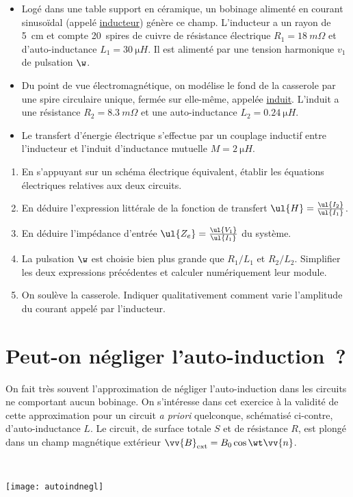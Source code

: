 \documentclass[a4paper, 10pt, final, garamond]{book}
\begin{document}
\begin{itemize}[label=$\diamond$, leftmargin=10pt]
  \item Logé dans une table support en céramique, un bobinage alimenté en
    courant sinusoïdal (appelé \ul{inducteur}) génère ce champ. L'inducteur a un
    rayon de \SI{5}{cm} et compte \SI{20}{spires} de cuivre de résistance
    électrique $R_1 = \SI{18}{m\Omega}$ et d'auto-inductance $L_1 =
    \SI{30}{\micro H}$. Il est alimenté par une tension harmonique $v_1$ de
    pulsation $\w$.
  \item Du point de vue électromagnétique, on modélise le fond de la casserole
    par une spire circulaire unique, fermée sur elle-même, appelée \ul{induit}.
    L'induit a une résistance $R_2 = \SI{8.3}{m\Omega}$ et une auto-inductance
    $L_2 = \SI{0.24}{\micro H}$.
  \item Le transfert d'énergie électrique s'effectue par un couplage inductif
    entre l'inducteur et l'induit d'inductance mutuelle $M = \SI{2}{\micro H}$.
\end{itemize}

\begin{enumerate}
  \item En s'appuyant sur un schéma électrique équivalent, établir les équations
    électriques relatives aux deux circuits.
  \item En déduire l'expression littérale de la fonction de transfert $\ul{H} =
    \frac{\ul{I_2}}{\ul{I_1}}$.
  \item En déduire l'impédance d'entrée $\ul{Z_e} = \frac{\ul{V_1}}{\ul{I_1}}$
    du système.
  \item La pulsation $\w$ est choisie bien plus grande que $R_1/L_1$ et
    $R_2/L_2$. Simplifier les deux expressions précédentes et calculer
    numériquement leur module.
  \item On soulève la casserole. Indiquer qualitativement comment varie
    l'amplitude du courant appelé par l'inducteur.
\end{enumerate}

\section{Peut-on négliger l'auto-induction~?}
\label{sec:neglautoind}

\noindent
\begin{minipage}[t]{.6\linewidth}
  On fait très souvent l'approximation de négliger l'auto-induction dans les
  circuits ne comportant aucun bobinage. On s'intéresse dans cet exercice à la
  validité de cette approximation pour un circuit \textit{a priori} quelconque,
  schématisé ci-contre, d'auto-inductance $L$. Le circuit, de surface totale $S$
  et de résistance $R$, est plongé dans un champ magnétique extérieur $\vv{B}_{\rm
  ext} = B_0 \cos{\wt}\vv{n}$.
\end{minipage}
\hfill
\begin{minipage}[t]{.39\linewidth}
  ~
  \vspace{-10pt}
  \begin{center}
    \texttt{[image: autoindnegl]}
    \label{fig:autoindnegl}
  \end{center}
\end{minipage}
\end{document}
